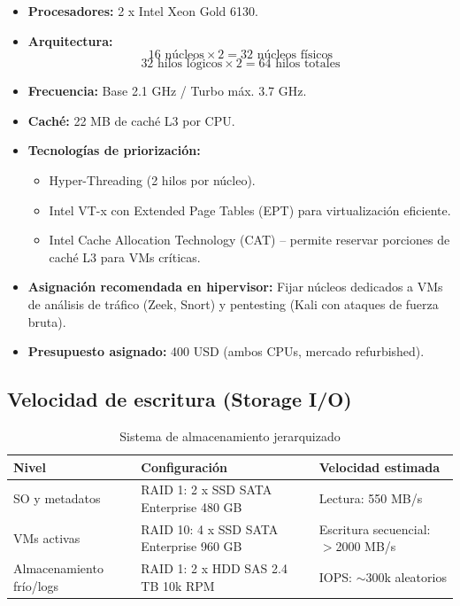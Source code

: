 \documentclass[12pt, letterpaper]{article}
\begin{document}
\begin{itemize}
    \item \textbf{Procesadores:} 2 x Intel Xeon Gold 6130.
    \item \textbf{Arquitectura:}
        \[
        \text{16 núcleos} \times 2 = 32 \text{ núcleos físicos}
        \]
        \[
        \text{32 hilos lógicos} \times 2 = 64 \text{ hilos totales}
        \]
    \item \textbf{Frecuencia:} Base 2.1 GHz / Turbo máx. 3.7 GHz.
    \item \textbf{Caché:} 22 MB de caché L3 por CPU.
    \item \textbf{Tecnologías de priorización:}
        \begin{itemize}
            \item Hyper-Threading (2 hilos por núcleo).
            \item Intel VT-x con Extended Page Tables (EPT) para virtualización eficiente.
            \item Intel Cache Allocation Technology (CAT) – permite reservar porciones de caché L3 para VMs críticas.
        \end{itemize}
    \item \textbf{Asignación recomendada en hipervisor:} Fijar núcleos dedicados a VMs de análisis de tráfico (Zeek, Snort) y pentesting (Kali con ataques de fuerza bruta).
    \item \textbf{Presupuesto asignado:} 400 USD (ambos CPUs, mercado refurbished).
\end{itemize}

\subsection{Velocidad de escritura (Storage I/O)}

\begin{table}[!ht]
    \centering
    \caption{Sistema de almacenamiento jerarquizado}
    \label{tab:storage}
    \begin{tabular}{p{4cm}p{6cm}p{3cm}}
        \toprule
        \textbf{Nivel} & \textbf{Configuración} & \textbf{Velocidad estimada} \\
        \midrule
        SO y metadatos & RAID 1: 2 x SSD SATA Enterprise 480 GB & Lectura: 550 MB/s \\
        VMs activas & RAID 10: 4 x SSD SATA Enterprise 960 GB & Escritura secuencial: $>$2000 MB/s \\
        Almacenamiento frío/logs & RAID 1: 2 x HDD SAS 2.4 TB 10k RPM & IOPS: $\sim$300k aleatorios \\
        \bottomrule
    \end{tabular}
\end{table}
\end{document}
